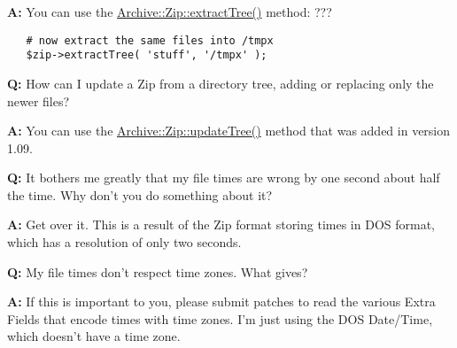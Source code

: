 \documentclass[]{article}
\let\realtextbf=\textbf
\renewcommand{\textbf}[1]{\textcolor{boldcolor}{\realtextbf{#1}}}
\renewcommand{\emph}[1]{\underline{#1}}
\begin{document}
\textbf{A:} You can use the \emph{Archive::Zip::extractTree()} method:
??? \textbar{}\textbar{}

\begin{verbatim}
   # now extract the same files into /tmpx
   $zip->extractTree( 'stuff', '/tmpx' );
\end{verbatim}


\textbf{Q:} How can I update a Zip from a directory tree, adding or
replacing only the newer files?

\textbf{A:} You can use the \emph{Archive::Zip::updateTree()} method
that was added in version 1.09.


\textbf{Q:} It bothers me greatly that my file times are wrong by one
second about half the time. Why don't you do something about it?

\textbf{A:} Get over it. This is a result of the Zip format storing
times in DOS format, which has a resolution of only two seconds.


\textbf{Q:} My file times don't respect time zones. What gives?

\textbf{A:} If this is important to you, please submit patches to read
the various Extra Fields that encode times with time zones. I'm just
using the DOS Date/Time, which doesn't have a time zone.
\end{document}
